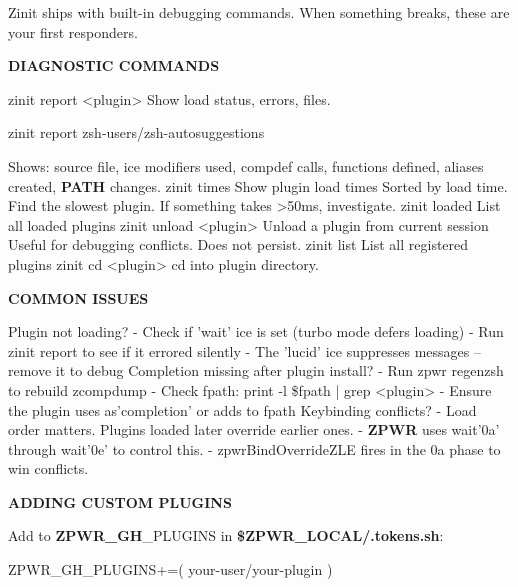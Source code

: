 \documentclass[11pt,a4paper,twoside]{book}
\begin{document}
Zinit ships with built-in debugging commands. When something breaks, these are your first responders.


\vspace{12pt}
{\bfseries\color{neonyellow} DIAGNOSTIC COMMANDS}\vspace{4pt}

zinit report <plugin>      Show load status, errors, files.

\begin{codebox}
\color{neongreen}zinit report zsh-users/zsh-autosuggestions\\
\end{codebox}

Shows: source file, ice modifiers used, compdef calls, functions defined, aliases created, \textbf{PATH} changes. zinit times               Show plugin load times Sorted by load time. Find the slowest plugin. If something takes >50ms, investigate. zinit loaded              List all loaded plugins zinit unload <plugin>      Unload a plugin from current session Useful for debugging conflicts. Does not persist. zinit list                List all registered plugins zinit cd <plugin>          cd into plugin directory.


\vspace{12pt}
{\bfseries\color{neonyellow} COMMON ISSUES}\vspace{4pt}

Plugin not loading? - Check if 'wait' ice is set (turbo mode defers loading) - Run zinit report to see if it errored silently - The 'lucid' ice suppresses messages -- remove it to debug Completion missing after plugin install? - Run zpwr regenzsh to rebuild zcompdump - Check fpath: print -l \$fpath | grep <plugin> - Ensure the plugin uses as'completion' or adds to fpath Keybinding conflicts? - Load order matters. Plugins loaded later override earlier ones. - \textbf{ZPWR} uses wait'0a' through wait'0e' to control this. - zpwrBindOverrideZLE fires in the 0a phase to win conflicts.


\vspace{12pt}
{\bfseries\color{neonyellow} ADDING CUSTOM PLUGINS}\vspace{4pt}

Add to \textbf{ZPWR\_GH}\_PLUGINS in \textbf{\$ZPWR\_LOCAL/.tokens.sh}:

\begin{codebox}
\color{neongreen}ZPWR\_GH\_PLUGINS+=( your-user/your-plugin )\\
\end{codebox}
\end{document}
